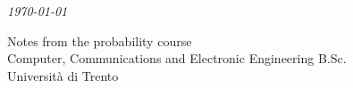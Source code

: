\makeatletter
\begin{titlepage}
    \begin{center}
        \vspace*{1cm}
 
        \Huge
        \textbf{\@title}
        \vspace{0.8cm}

        \Large
        \@author

        \vspace{0.5cm}
        \large
        \textit{\today}
 
        \vfill
        \normalsize
             
        Notes from the probability course\\
        Computer, Communications and Electronic Engineering B.Sc.\\
        Università di Trento\\
             
    \end{center}
\end{titlepage}
\makeatother